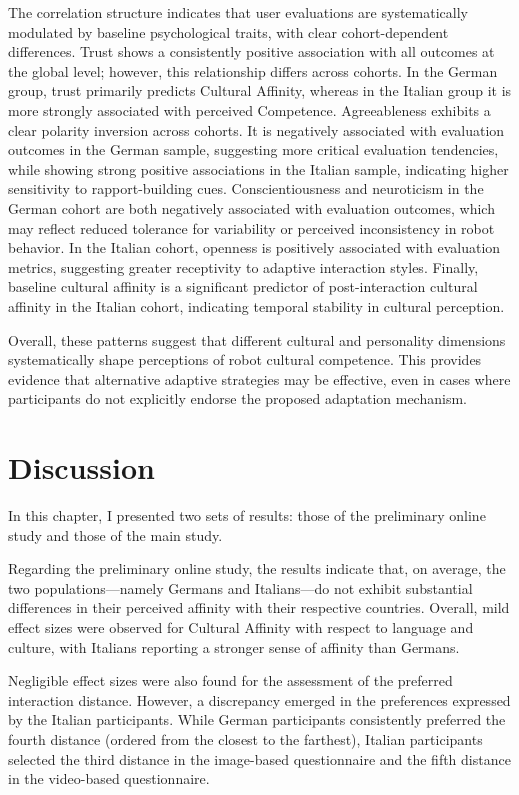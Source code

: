 The correlation structure indicates that user evaluations are systematically modulated by baseline psychological traits, with clear cohort-dependent differences. Trust shows a consistently positive association with all outcomes at the global level; however, this relationship differs across cohorts. In the German group, trust primarily predicts Cultural Affinity, whereas in the Italian group it is more strongly associated with perceived Competence. Agreeableness exhibits a clear polarity inversion across cohorts. It is negatively associated with evaluation outcomes in the German sample, suggesting more critical evaluation tendencies, while showing strong positive associations in the Italian sample, indicating higher sensitivity to rapport-building cues. Conscientiousness and neuroticism in the German cohort are both negatively associated with evaluation outcomes, which may reflect reduced tolerance for variability or perceived inconsistency in robot behavior. In the Italian cohort, openness is positively associated with evaluation metrics, suggesting greater receptivity to adaptive interaction styles. Finally, baseline cultural affinity is a significant predictor of post-interaction cultural affinity in the Italian cohort, indicating temporal stability in cultural perception.

Overall, these patterns suggest that different cultural and personality dimensions systematically shape perceptions of robot cultural competence. This provides evidence that alternative adaptive strategies may be effective, even in cases where participants do not explicitly endorse the proposed adaptation mechanism.

\section{Discussion}
In this chapter, I presented two sets of results: those of the preliminary online study and those of the main study.

Regarding the preliminary online study, the results indicate that, on average, the two populations—namely Germans and Italians—do not exhibit substantial differences in their perceived affinity with their respective countries. Overall, mild effect sizes were observed for Cultural Affinity with respect to language and culture, with Italians reporting a stronger sense of affinity than Germans.

Negligible effect sizes were also found for the assessment of the preferred interaction distance. However, a discrepancy emerged in the preferences expressed by the Italian participants. While German participants consistently preferred the fourth distance (ordered from the closest to the farthest), Italian participants selected the third distance in the image-based questionnaire and the fifth distance in the video-based questionnaire.

